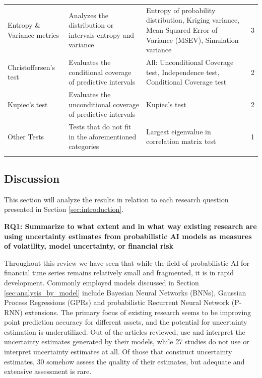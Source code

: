 \begin{table}[H]
\begin{adjustbox}{width=0.5\textwidth,center}
\begin{tabular}{p{}p{}p{}p{}}
        \addlinespace
        \hdashline[0.2pt/3pt]
        \addlinespace
        Entropy \& Variance metrics & Analyzes the distribution or intervals entropy and variance & Entropy of probability distribution, Kriging variance, Mean Squared Error of Variance (MSEV), Simulation variance & 3 \\
        \addlinespace
        \hdashline[0.2pt/3pt]
        \addlinespace
        Christoffersen's test & Evaluates the conditional coverage of predictive intervals & All: Unconditional Coverage test, Independence test, Conditional Coverage test & 2 \\
        \addlinespace
        \hdashline[0.2pt/3pt]
        \addlinespace
        Kupiec's test &  Evaluates the unconditional coverage of predictive intervals & Kupiec's test & 2 \\
        \addlinespace
        \hdashline[0.2pt/3pt]
        \addlinespace
        Other Tests & Tests that do not fit in the aforementioned categories & Largest eigenvalue in correlation matrix test  & 1\\
        \addlinespace
        \bottomrule
    \end{tabular}
    \end{adjustbox}
\end{table}



\subsection{Discussion}
\label{sec:discussion}
This section will analyze the results in relation to each research question presented in Section \ref{sec:introduction}.

\textbf{RQ1: Summarize to what extent and in what way existing research are using uncertainty estimates from probabilistic AI models as measures of volatility, model uncertainty, or financial risk}\nopagebreak

Throughout this review we have seen that while the field of probabilistic AI for financial time series remains relatively small and fragmented, it is in rapid development. Commonly employed models discussed in Section \ref{sec:analysis_by_model} include Bayesian Neural Networks (BNNs), Gaussian Process Regressions (GPRs) and probabilistic Recurrent Neural Network (P-RNN) extensions. The primary focus of existing research seems to be improving point prediction accuracy for different assets, and the potential for uncertainty estimation is underutilized. Out of the \samplesize articles reviewed, \uqanyinterpretation use and interpret the uncertainty estimates generated by their models, while 27 studies do not use or interpret uncertainty estimates at all. Of those that construct uncertainty estimates, 30 somehow assess the quality of their estimates, but adequate and extensive assessment is rare. 

